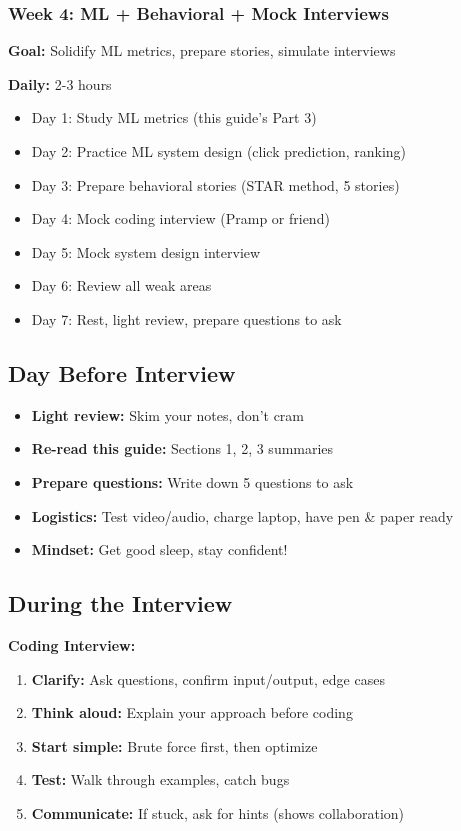 \documentclass[11pt,letterpaper]{article}
\begin{document}
\subsubsection{Week 4: ML + Behavioral + Mock Interviews}

\textbf{Goal:} Solidify ML metrics, prepare stories, simulate interviews

\textbf{Daily:} 2-3 hours
\begin{itemize}
    \item Day 1: Study ML metrics (this guide's Part 3)
    \item Day 2: Practice ML system design (click prediction, ranking)
    \item Day 3: Prepare behavioral stories (STAR method, 5 stories)
    \item Day 4: Mock coding interview (Pramp or friend)
    \item Day 5: Mock system design interview
    \item Day 6: Review all weak areas
    \item Day 7: Rest, light review, prepare questions to ask
\end{itemize}

\subsection{Day Before Interview}

\begin{itemize}
    \item \textbf{Light review:} Skim your notes, don't cram
    \item \textbf{Re-read this guide:} Sections 1, 2, 3 summaries
    \item \textbf{Prepare questions:} Write down 5 questions to ask
    \item \textbf{Logistics:} Test video/audio, charge laptop, have pen \& paper ready
    \item \textbf{Mindset:} Get good sleep, stay confident!
\end{itemize}

\subsection{During the Interview}

\textbf{Coding Interview:}
\begin{enumerate}
    \item \textbf{Clarify:} Ask questions, confirm input/output, edge cases
    \item \textbf{Think aloud:} Explain your approach before coding
    \item \textbf{Start simple:} Brute force first, then optimize
    \item \textbf{Test:} Walk through examples, catch bugs
    \item \textbf{Communicate:} If stuck, ask for hints (shows collaboration)
\end{enumerate}
\end{document}

